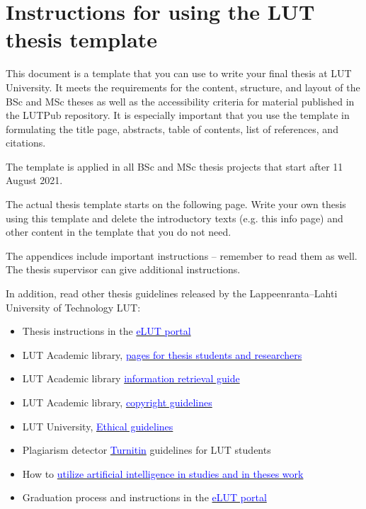\section*{Instructions for using the LUT thesis template}

{\color{red}This document is a template that you can use to write your final thesis at LUT University. It meets the requirements for the content, structure, and layout of the BSc and MSc theses as well as the accessibility criteria for material published in the LUTPub repository. It is especially important that you use the template in formulating the title page, abstracts, table of contents, list of references, and citations.

The template is applied in all BSc and MSc thesis projects that start after 11 August 2021.

The actual thesis template starts on the following page. Write your own thesis using this template and delete the introductory texts (e.g. this info page) and other content in the template that you do not need.

The appendices include important instructions – remember to read them as well. The thesis supervisor can give additional instructions.

In addition, read other thesis guidelines released by the Lappeenranta–Lahti University of Technology LUT: 
\begin{itemize}
    \item Thesis instructions in the \href{https://elut.lut.fi/en/completing-studies/theses}{\textcolor{blue}{eLUT portal}}
    \item LUT Academic library, \href{https://www.lut.fi/en/about-us/lut-academic-library/theses-and-dissertations}{\textcolor{blue}{pages for thesis students and researchers}} 
    \item LUT Academic library \href{https://libguides.lut.fi/informationliteracy}{\textcolor{blue}{information retrieval guide}}
    \item LUT Academic library, \href{https://libguides.lut.fi/copyright/}{\textcolor{blue}{copyright guidelines}} 
    \item LUT University, \href{https://elut.lut.fi/en/completing-studies/rules-and-regulations/ethical-guidelines-and-guidelines-handling-misconduct}{\textcolor{blue}{Ethical guidelines}} 
    \item Plagiarism detector \href{https://elut.lut.fi/en/it-instructions-study-tools/turnitin}{\textcolor{blue}{Turnitin}} guidelines for LUT students
    \item How to \href{https://elut.lut.fi/en/completing-studies/rules-and-regulations/ai-based-tools-policies}{\textcolor{blue}{utilize artificial intelligence in studies and in theses work}}
    \item Graduation process and instructions in the \href{https://elut.lut.fi/en/graduation}{\textcolor{blue}{eLUT portal}}
\end{itemize}
}

\clearpage  %

